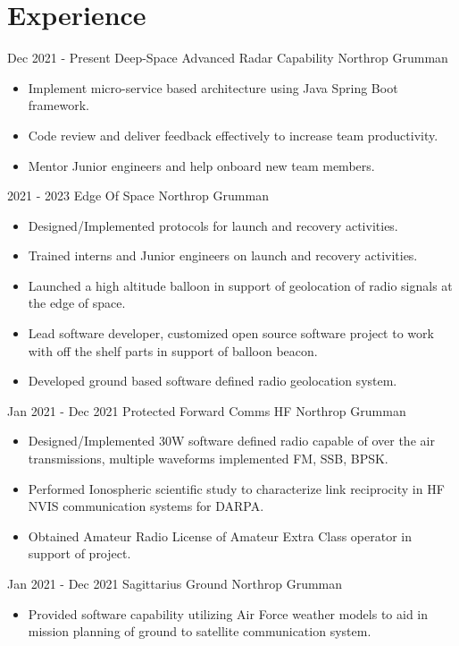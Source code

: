 \documentclass[]{src/friggeri-cv}
\begin{document}
\section{Experience}
\begin{entrylist}
  \entry
    {Dec 2021 - Present}
    {Deep-Space Advanced Radar Capability}
    {Northrop Grumman}
    {\begin{itemize}
        \item Implement micro-service based architecture using Java Spring Boot framework.
        \item Code review and deliver feedback effectively to increase team productivity.
        \item Mentor Junior engineers and help onboard new team members.
    \end{itemize}}
  \entry
    {2021 - 2023}
    {Edge Of Space}
    {Northrop Grumman}
    {\begin{itemize}
        \item Designed/Implemented protocols for launch and recovery activities.
        \item Trained interns and Junior engineers on launch and recovery activities.
        \item Launched a high altitude balloon in support of geolocation of radio signals at the edge of space.
        \item Lead software developer, customized open source software project to work with off the shelf parts in support of balloon beacon.
        \item Developed ground based software defined radio geolocation system.
    \end{itemize}}
  \entry
    {Jan 2021 - Dec 2021}
    {Protected Forward Comms HF}
    {Northrop Grumman}
    {\begin{itemize}
        \item Designed/Implemented 30W software defined radio capable of over the air transmissions, multiple waveforms implemented FM, SSB, BPSK.
        \item Performed Ionospheric scientific study to characterize link reciprocity in HF NVIS communication systems for DARPA.
        \item Obtained Amateur Radio License of Amateur Extra Class operator in support of project.
    \end{itemize}}
  \entry
    {Jan 2021 - Dec 2021}
    {Sagittarius Ground}
    {Northrop Grumman}
    {\begin{itemize}
        \item Provided software capability utilizing Air Force weather models to aid in mission planning of ground to satellite communication system.

\end{itemize}}
\end{entrylist}
\end{document}
